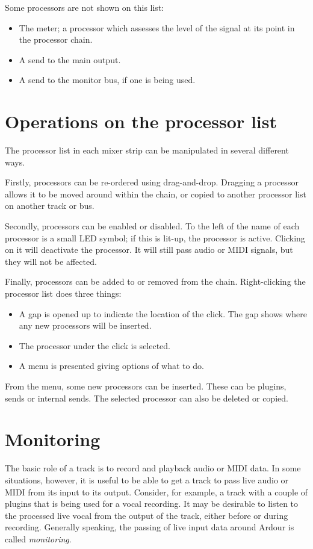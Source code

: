\documentclass[10pt,a4paper]{book}
\begin{document}
Some processors are not shown on this list:

\begin{itemize}
\item The meter; a processor which assesses the level of the signal at
  its point in the processor chain.
\item A send to the main output.
\item A send to the monitor bus, if one is being used.
\end{itemize}


\section{Operations on the processor list}

The processor list in each mixer strip can be manipulated in several
different ways.

Firstly, processors can be re-ordered using drag-and-drop.  Dragging a
processor allows it to be moved around within the chain, or copied to
another processor list on another track or bus.

Secondly, processors can be enabled or disabled.  To the left of the
name of each processor is a small LED symbol; if this is lit-up, the
processor is active.  Clicking on it will deactivate the processor.
It will still pass audio or MIDI signals, but they will not be
affected.

Finally, processors can be added to or removed from the chain.
Right-clicking the processor list does three things:

\begin{itemize}
\item A gap is opened up to indicate the location of the click.  The
  gap shows where any new processors will be inserted.
\item The processor under the click is selected.
\item A menu is presented giving options of what to do.
\end{itemize}

From the menu, some new processors can be inserted.  These can be
plugins, sends or internal sends.  The selected processor can also be
deleted or copied.



\section{Monitoring}

The basic role of a track is to record and playback audio or MIDI
data.  In some situations, however, it is useful to be able to get a
track to pass live audio or MIDI from its input to its output.
Consider, for example, a track with a couple of plugins that is being
used for a vocal recording.  It may be desirable to listen to the
processed live vocal from the output of the track, either before or
during recording.  Generally speaking, the passing of live input data
around Ardour is called \emph{monitoring}.
\end{document}
